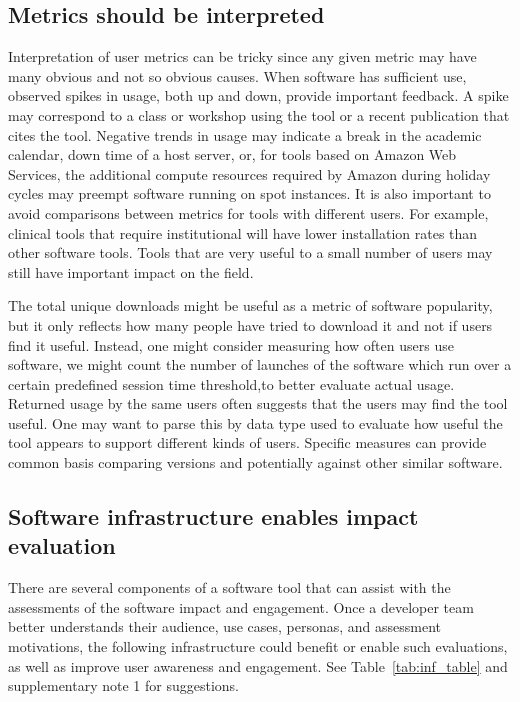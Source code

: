 \documentclass{article}
\begin{document}
 \subsection{Metrics should be interpreted}
 
 Interpretation of user metrics can be tricky since any given metric may have many obvious and not so obvious causes. When software has sufficient use, observed spikes in usage, both up and down, provide important feedback. A spike may correspond to a class or workshop using the tool or a recent publication that cites the tool. Negative trends in usage may indicate a break in the academic calendar, down time of a host server, or, for tools based on Amazon Web Services, the additional compute resources required by Amazon during holiday cycles may preempt software running on spot instances. It is also important to avoid comparisons between metrics for tools with different users. For example, clinical tools that require institutional will have lower installation rates than other software tools. Tools that are very useful to a small number of users may still have important impact on the field.

The total unique downloads might be useful as a metric of software popularity, but it only reflects how many people have tried to download it and not if users find it useful. Instead, one might consider measuring how often users use software, we might count the number of launches of the software which run over a certain predefined session time threshold,to better evaluate actual usage. Returned usage by the same users often suggests that the users may find the tool useful. One may want to parse this by data type used to evaluate how useful the tool appears to support different kinds of users.   Specific measures can provide common basis comparing versions and potentially against other similar software.


\subsection{Software infrastructure enables impact evaluation}
There are several components of a software tool that can assist with the assessments of the software impact and engagement. Once a developer team better understands their audience, use cases, personas, and assessment motivations, the following infrastructure could benefit or enable such evaluations, as well as improve user awareness and engagement. 
See Table~\ref{tab:inf_table} and supplementary note 1 for suggestions.
\end{document}
